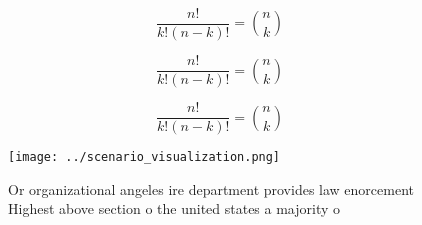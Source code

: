 \documentclass[a4paper]{article}
\begin{document}
\[ \frac{n!}{k!(n-k)!} = \binom{n}{k} \]

\[ \frac{n!}{k!(n-k)!} = \binom{n}{k} \]

\[ \frac{n!}{k!(n-k)!} = \binom{n}{k} \]

\begin{figure}
\centering
\texttt{[image: ../scenario\_visualization.png]}
\caption{Or organizational angeles ire department provides law enorcement Highest above section o the united states a majority o
}
\end{figure}
 
\end{document}
